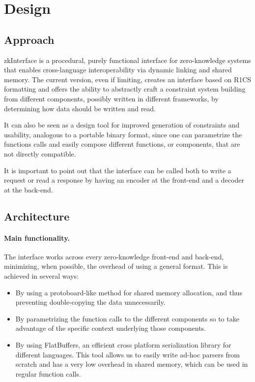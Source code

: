 \section{Design}

\subsection{Approach}

zkInterface is a procedural, purely functional interface for zero-knowledge systems that enables cross-language interoperability via dynamic linking and shared memory. The current version, even if limiting, creates an interface based on R1CS formatting and offers the ability to abstractly craft a constraint system building from different components, possibly written in different frameworks, by determining how data should be written and read. 

It can also be seen as a design tool for improved generation of constraints and usability, analogous to a portable binary format, since one can parametrize the functions calls and easily compose different functions, or components, that are not directly compatible.

It is important to point out that the interface can be called both to write a request or read a response by having an encoder at the front-end  and a decoder at the back-end. 


\subsection{Architecture}

		
		
\paragraph{Main functionality.}

The interface works across every zero-knowledge front-end and back-end, minimizing, when possible, the overhead of using a general format. This is achieved in several ways:

\begin{itemize}
	\item By using a protoboard-like method for shared memory allocation, and thus preventing double-copying the data unnecessarily.
	\item By parametrizing the function calls to the different components so to take advantage of the specific context underlying those components.
	\item By using FlatBuffers, an efficient cross platform serialization library for different languages. This tool allows us to easily write ad-hoc parsers from scratch and has a very low overhead in shared memory, which can be used in regular function calls. 
\end{itemize}
		

